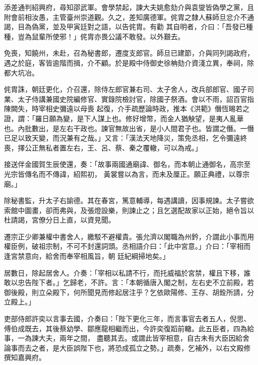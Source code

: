 \begin{pinyinscope}
 添差通判紹興府，尋知邵武軍。會學禁起，諫大夫姚愈劾介與袁燮皆偽學之黨，且附會前相汝愚，主管臺州崇道觀。久之，差知廣德軍。侂胄之隸人蘇師旦忿介不通謁，目為偽黨，並及甲寅廷對之語，以告侂胄。有勸
 其自明者，介曰：「吾發已種種，豈為鼠輩所使邪！」侂胄亦畏公議不敢發。以外艱去。



 免喪，知饒州，未赴，召為秘書郎，遷度支郎官。師旦已建節，介與同列謁政府，遇之於庭，客皆逾階而揖，介不顧。於是殿中侍御史徐柟劾介資淺立異，奉祠，除都大坑冶。



 侂胄誅，朝廷更化，介召還，除侍左郎官兼右司、太子舍人，改兵部郎官、國子司業、太子侍講兼國史院編修官、實錄院檢討官，除國子祭酒。會以不雨，詔百官指陳闕失，時宰相史彌遠以母喪
 起復，介手疏歷論時政，推本《洪範》僭恆晹若之證，謂：「羅日願為變，是下人謀上也。修好增幣，而金人猶觖望，是夷人亂華也。內批數出，是左右干政也。諫官無故出省，是小人間君子也。皆謂之僭。一僭已足以致天變，而況兼有之哉。」又言：「漢法天地降災，策免丞相，乞令彌遠終喪，擇公正無私者置左右，王、呂、蔡、秦之覆轍，可以為戒。」



 接送伴金國賀生辰使還，奏：「故事兩國通廟諱、御名，而本朝止通御名，高宗至光宗皆傳名而不傳諱，紹熙初，
 黃裳嘗以為言，而未及厘正。願正典禮，以尊宗廟。」



 除秘書監，升太子右諭德。其在春宮，篤意輔導，每遇講讀，因事規諫。太子嘗欲索館中圖畫，卻而弗與，及張燈設樂，則諫止之；且乞選配故家以正始，絕令旨以杜請謁，宮僚分日上直，以資見聞。



 遷宗正少卿兼權中書舍人，繳駁不避權貴。張允濟以閣職為州鈐，介謂此小事而用權臣例，破祖宗制，不可不封還詞頭。丞相語介曰：「此中宮意。」介曰：「宰相而逢宮禁意向，給舍而奉宰相風旨，朝
 廷紀綱掃地矣。」



 居數日，除起居舍人。介奏：「宰相以私請不行，而托威福於宮禁，權且下移，誰敢以忠告陛下者。」乞歸老，不許。言：「本朝循唐入閣之制，左右史不立前殿，若御後殿，則立朵殿下，何所聞見而修起居注乎？乞依歐陽修、王存、胡銓所請，分立殿上。」



 吏部侍郎許奕以言事去國，介奏曰：「陛下更化三年，而言事官去者五人，倪思、傅伯成既去，其後蔡幼學、鄒應龍相繼而出，今許奕復蹈前轍。此五臣者，四為給事，一為諫大夫，兩年之間，
 盡聽其去。或謂此皆宰相意，自古未有大臣因給舍論事而去之者，是大臣誤陛下也，將恐成孤立之勢。」疏奏，乞補外，以右文殿修撰知嘉興府。




\end{pinyinscope}
